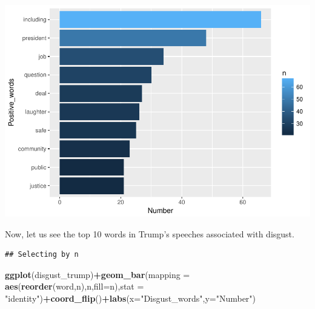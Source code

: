 \documentclass[]{article}
\newenvironment{Shaded}{\begin{snugshade}}{\end{snugshade}}
\newcommand{\KeywordTok}[1]{\textcolor[rgb]{0.13,0.29,0.53}{\textbf{#1}}}
\newcommand{\DataTypeTok}[1]{\textcolor[rgb]{0.13,0.29,0.53}{#1}}
\newcommand{\DecValTok}[1]{\textcolor[rgb]{0.00,0.00,0.81}{#1}}
\newcommand{\StringTok}[1]{\textcolor[rgb]{0.31,0.60,0.02}{#1}}
\newcommand{\OperatorTok}[1]{\textcolor[rgb]{0.81,0.36,0.00}{\textbf{#1}}}
\newcommand{\NormalTok}[1]{#1}
\begin{document}
\includegraphics{Donald_Trump_Speech_sentiment_analysis_files/figure-latex/unnamed-chunk-36-1.pdf}

Now, let us see the top 10 words in Trump's speeches associated with
disgust.

\begin{Shaded}
\end{Shaded}

\begin{verbatim}
## Selecting by n
\end{verbatim}

\begin{Shaded}
\begin{Highlighting}[]
\KeywordTok{ggplot}\NormalTok{(disgust_trump)}\OperatorTok{+}\KeywordTok{geom_bar}\NormalTok{(}\DataTypeTok{mapping =} \KeywordTok{aes}\NormalTok{(}\KeywordTok{reorder}\NormalTok{(word,n),n,}\DataTypeTok{fill=}\NormalTok{n),}\DataTypeTok{stat =} \StringTok{"identity"}\NormalTok{)}\OperatorTok{+}\KeywordTok{coord_flip}\NormalTok{()}\OperatorTok{+}\KeywordTok{labs}\NormalTok{(}\DataTypeTok{x=}\StringTok{"Disgust_words"}\NormalTok{,}\DataTypeTok{y=}\StringTok{"Number"}\NormalTok{)}
\end{Highlighting}
\end{Shaded}
\end{document}
